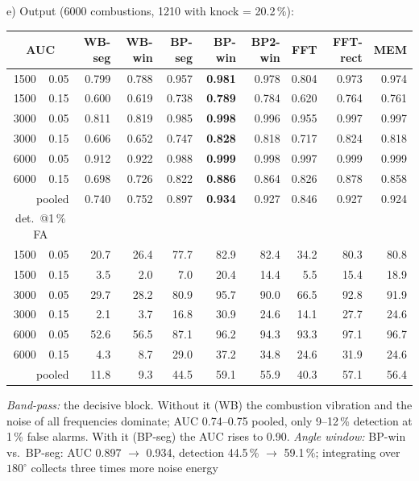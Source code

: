 \begin{solution}
e) Output (6000 combustions, 1210 with knock = 20.2\,\%):
\begin{center}
\small
\setlength{\tabcolsep}{4pt}
\begin{tabular}{@{}rr|rrrrrrrr@{}}
\toprule
\multicolumn{2}{c|}{AUC} & WB-seg & WB-win & BP-seg & BP-win & BP2-win & FFT & FFT-rect & MEM\\
\midrule
1500 & 0.05 & 0.799 & 0.788 & 0.957 & \textbf{0.981} & 0.978 & 0.804 & 0.973 & 0.974\\
1500 & 0.15 & 0.600 & 0.619 & 0.738 & \textbf{0.789} & 0.784 & 0.620 & 0.764 & 0.761\\
3000 & 0.05 & 0.811 & 0.819 & 0.985 & \textbf{0.998} & 0.996 & 0.955 & 0.997 & 0.997\\
3000 & 0.15 & 0.606 & 0.652 & 0.747 & \textbf{0.828} & 0.818 & 0.717 & 0.824 & 0.818\\
6000 & 0.05 & 0.912 & 0.922 & 0.988 & \textbf{0.999} & 0.998 & 0.997 & 0.999 & 0.999\\
6000 & 0.15 & 0.698 & 0.726 & 0.822 & \textbf{0.886} & 0.864 & 0.826 & 0.878 & 0.858\\
\multicolumn{2}{r|}{pooled} & 0.740 & 0.752 & 0.897 & \textbf{0.934} & 0.927 & 0.846 & 0.927 & 0.924\\
\midrule
\multicolumn{2}{c|}{det.\ @1\,\% FA} &&&&&&&&\\
1500 & 0.05 & 20.7 & 26.4 & 77.7 & 82.9 & 82.4 & 34.2 & 80.3 & 80.8\\
1500 & 0.15 & 3.5 & 2.0 & 7.0 & 20.4 & 14.4 & 5.5 & 15.4 & 18.9\\
3000 & 0.05 & 29.7 & 28.2 & 80.9 & 95.7 & 90.0 & 66.5 & 92.8 & 91.9\\
3000 & 0.15 & 2.1 & 3.7 & 16.8 & 30.9 & 24.6 & 14.1 & 27.7 & 24.6\\
6000 & 0.05 & 52.6 & 56.5 & 87.1 & 96.2 & 94.3 & 93.3 & 97.1 & 96.7\\
6000 & 0.15 & 4.3 & 8.7 & 29.0 & 37.2 & 34.8 & 24.6 & 31.9 & 24.6\\
\multicolumn{2}{r|}{pooled} & 11.8 & 9.3 & 44.5 & 59.1 & 55.9 & 40.3 & 57.1 & 56.4\\
\bottomrule
\end{tabular}
\end{center}
\emph{Band-pass:} the decisive block. Without it (WB) the combustion vibration and the
noise of all frequencies dominate; AUC 0.74--0.75 pooled, only 9--12\,\% detection at
1\,\% false alarms. With it (BP-seg) the AUC rises to 0.90.
\emph{Angle window:} BP-win vs.\ BP-seg: AUC 0.897 $\to$ 0.934, detection 44.5\,\%
$\to$ 59.1\,\%; integrating over $180^\circ$ collects three times more noise energy

\end{solution}
